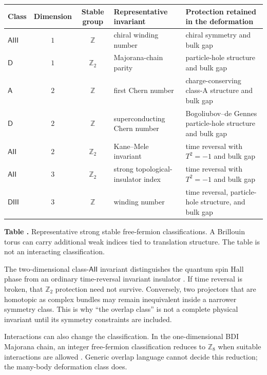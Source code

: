 \documentclass[11pt]{article}
\theoremstyle{definition}
\theoremstyle{remark}
\newcommand{\Z}{\mathbb{Z}}
\begin{document}
\begin{center}
\centering
\small
{}\label{tab:classes}
\begin{tabularx}{\textwidth}{@{}l c c Y Y@{}}
\toprule
Class & Dimension & Stable group & Representative invariant
& Protection retained in the deformation \\
\midrule
\(\mathsf{AIII}\) & \(1\) & \(\Z\) & chiral winding number
& chiral symmetry and bulk gap \\
\(\mathsf{D}\) & \(1\) & \(\Z_2\) & Majorana-chain parity
& particle-hole structure and bulk gap \\
\(\mathsf{A}\) & \(2\) & \(\Z\) & first Chern number
& charge-conserving class-A structure and bulk gap \\
\(\mathsf{D}\) & \(2\) & \(\Z\) & superconducting Chern number
& Bogoliubov--de Gennes particle-hole structure and bulk gap \\
\(\mathsf{AII}\) & \(2\) & \(\Z_2\) & Kane--Mele invariant
& time reversal with \(T^2=-1\) and bulk gap \\
\(\mathsf{AII}\) & \(3\) & \(\Z_2\) & strong topological-insulator index
& time reversal with \(T^2=-1\) and bulk gap \\
\(\mathsf{DIII}\) & \(3\) & \(\Z\) & winding number
& time reversal, particle-hole structure, and bulk gap \\
\bottomrule
\end{tabularx}
\par\smallskip
\begin{minipage}{0.98\textwidth}
\small\textbf{Table \thetable.}
Representative strong stable free-fermion classifications.  A
Brillouin torus can carry additional weak indices tied to translation
structure.  The table is not an interacting classification.
\end{minipage}
\end{center}

The two-dimensional class-\(\mathsf{AII}\) invariant distinguishes the
quantum spin Hall phase from an ordinary time-reversal invariant insulator
\cite{KaneMele2005}.  If time reversal is broken, that \(\Z_2\) protection
need not survive.  Conversely, two projectors that are homotopic as complex
bundles may remain inequivalent inside a narrower symmetry class.  This is
why ``the overlap class'' is not a complete physical invariant until its
symmetry constraints are included.

Interactions can also change the classification.  In the one-dimensional
BDI Majorana chain, an integer free-fermion classification reduces to
\(\Z_8\) when suitable interactions are allowed
\cite{FidkowskiKitaev2010}.  Generic overlap language cannot decide this
reduction; the many-body deformation class does.
\end{document}
